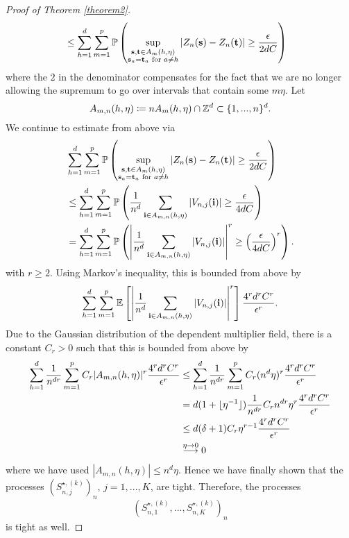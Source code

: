 \begin{proof}[Proof of Theorem \ref{theorem2}]
\begin{align*}
        & \leq \sum\limits_{h=1}^d \sum\limits_{m=1}^p \mathbb{P}\left(\sup\limits_{\substack{\mathbf{s}, \mathbf{t} \in A_m(h, \eta) \\ \mathbf{s}_a = \mathbf{t}_a \text{ for } a \neq h}} \left| Z_n(\mathbf{s}) - Z_n(\mathbf{t}) \right| \geq \frac{\epsilon}{2dC} \right)
    \end{align*}
    where the $2$ in the denominator compensates for the fact that we are no longer allowing the supremum to go over intervals that contain some $m \eta$.
    Let
    \[ A_{m, n}(h, \eta) \coloneqq nA_m(h, \eta) \cap \mathbb{Z}^d \subset \{1, ...,n \}^d. \]
    We continue to estimate from above via
    \begin{align*}
        & \sum\limits_{h=1}^d \sum\limits_{m=1}^p \mathbb{P}\left(\sup\limits_{\substack{\mathbf{s}, \mathbf{t} \in A_m(h, \eta) \\ \mathbf{s}_a = \mathbf{t}_a \text{ for } a \neq h}} \left| Z_n(\mathbf{s}) - Z_n(\mathbf{t}) \right| \geq \frac{\epsilon}{2dC} \right) \\
        & \leq \sum\limits_{h=1}^d \sum\limits_{m=1}^p \mathbb{P}\left( \frac{1}{n^d} \sum\limits_{\mathbf{i} \in A_{m, n}(h, \eta)} \left| V_{n, j}(\mathbf{i}) \right| \geq \frac{\epsilon}{4dC} \right) \\
        & =  \sum\limits_{h=1}^d \sum\limits_{m=1}^p \mathbb{P}\left( \left| \frac{1}{n^d} \sum\limits_{\mathbf{i} \in A_{m, n}(h, \eta)} \left| V_{n, j}(\mathbf{i}) \right| \right|^r \geq \left(\frac{\epsilon}{4dC}\right)^r \right).
    \end{align*}
    with $r \geq 2$. Using Markov's inequality, this is bounded from above by
    \begin{align*}
        \sum\limits_{h=1}^d \sum\limits_{m=1}^p \mathbb{E}\left[\left| \frac{1}{n^d} \sum\limits_{\mathbf{i} \in A_{m, n}(h, \eta)} \left| V_{n, j}(\mathbf{i}) \right| \right|^r\right] \frac{4^rd^rC^r}{\epsilon^r}.
    \end{align*}
    Due to the Gaussian distribution of the dependent multiplier field, there is a constant $C_r > 0$ such that this is bounded from above by
    \begin{align*}
        \sum\limits_{h=1}^d \frac{1}{n^{dr}} \sum\limits_{m=1}^p C_r |A_{m, n}(h, \eta)|^r \frac{4^rd^rC^r}{\epsilon^r}
        & \leq \sum\limits_{h=1}^d \frac{1}{n^{dr}} \sum\limits_{m=1}^p C_r (n^d \eta)^r \frac{4^rd^rC^r}{\epsilon^r} \\
        & = d (1 + \lfloor\eta^{-1}\rfloor) \frac{1}{n^{dr}} C_r n^{dr} \eta^r \frac{4^rd^rC^r}{\epsilon^r} \\
        & \leq d (\delta + 1) C_r \eta^{r-1} \frac{4^rd^rC^r}{\epsilon^r} \\
        & \stackrel{\eta \to 0}{\longrightarrow} 0
    \end{align*}
    where we have used $|A_{m, n}(h, \eta)| \leq n^d \eta$. Hence we have finally shown that the processes $\left(S_{n, j}^{\star, (k)}\right)_n$, $j = 1, ..., K$, are tight. Therefore, the processes 
    \[ \left(S_{n, 1}^{\star, (k)}, ..., S_{n, K}^{\star, (k)}\right)_n \]
    is tight as well.



\end{proof}
